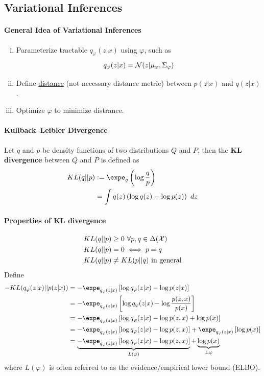 \documentclass{article}
\begin{document}
	\subsection{Variational Inferences}
	\paragraph{General Idea of Variational Inferences}
	\begin{enumerate}[(i)]
		\item Parameterize tractable $q_\varphi (z | x)$ using $\varphi$, such as
		\begin{align}
			q_\varphi (z | x) = \mathcal{{N}}(z | \mu_\varphi, \Sigma_\varphi)
		\end{align}
		\item Define \ul{distance} (not necessary distance metric) between $p(z|x)$ and $q(z|x)$.
		\item Optimize $\varphi$ to minimize distrance.
	\end{enumerate}
	
	\paragraph{Kullback–Leibler Divergence}
	\begin{definition}
		Let $q$ and $p$ be density functions of two distributions $Q$ and $P$, then the \textbf{KL divergence} between $Q$ and $P$ is defined as
		\begin{align}
			KL(q || p) &:= \expe_{q} \left(\log{\frac{q}{p}} \right) \\
			&= \int q(z) \left( \log q(z) - \log p(z) \right)\ dz
		\end{align}
	\end{definition}
	\paragraph{Properties of KL divergence}
	\begin{align}
		KL(q || p) &\geq 0\ \forall p, q \in \Delta(\mathcal{{X}}) \\
		KL(q || p) &= 0 \iff p = q \\
		KL(q || p) &\neq KL(p || q) \text{{ in general}}
	\end{align}
	Define
	\begin{align}
		- KL(q_\varphi(z|x) || p(z|x)) 
		&= - \expe_{q_\varphi(z|x)} \left[
		\log q_\varphi(z|x) - \log p(z|x)
		\right] \\
		&= - \expe_{q_\varphi(z|x)} \left[
		\log q_\varphi(z|x) - \log \frac{p(z, x)}{p(x)}
		\right] \\
		&= - \expe_{q_\varphi(z|x)} \left[
		\log q_\varphi(z|x) - \log p(z, x) + \log p(x)
		\right] \\
		&= - \expe_{q_\varphi(z|x)} \left[
		\log q_\varphi(z|x) - \log p(z, x) \right]
		+ \expe_{q_\varphi(z|x)} \left[ \log p(x)
		\right] \\
		&= \underbrace{- \expe_{q_\varphi(z|x)} \left[
		\log q_\varphi(z|x) - \log p(z, x) \right]}_{L(\varphi)}
		+ \underbrace{\log p(x)}_{\perp \varphi}
	\end{align}
	where $L(\varphi)$ is often referred to as the evidence/empirical lower bound (ELBO).
	
\end{document}
